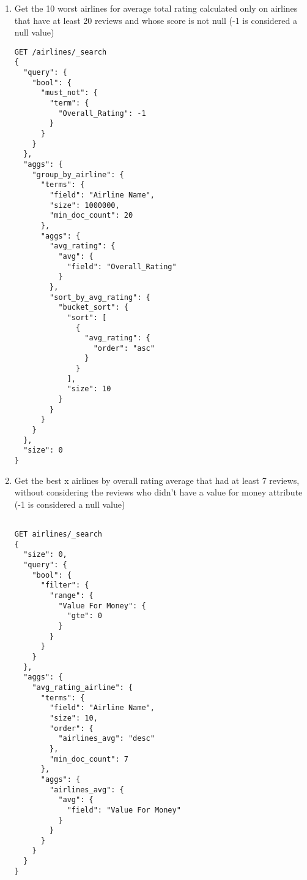 \documentclass{Configuration_Files/PoliMi3i_thesis}
\begin{document}
\begin{enumerate}
    \item Get the 10 worst airlines for average total rating calculated only on airlines that have at least 20 reviews and whose score is not null (-1 is considered a null value)

    \begin{verbatim}
GET /airlines/_search
{
  "query": {
    "bool": {
      "must_not": {
        "term": {
          "Overall_Rating": -1
        }
      }
    }
  },
  "aggs": {
    "group_by_airline": {
      "terms": {
        "field": "Airline Name",
        "size": 1000000, 
        "min_doc_count": 20
      },
      "aggs": {
        "avg_rating": {
          "avg": {
            "field": "Overall_Rating"
          }
        },
        "sort_by_avg_rating": {
          "bucket_sort": {
            "sort": [
              {
                "avg_rating": {
                  "order": "asc"  
                }
              }
            ],
            "size": 10 
          }
        }
      }
    }
  },
  "size": 0
}

    \end{verbatim}
    
    \item Get the best x airlines by overall rating average that had at least 7 reviews, without considering the reviews who didn't have a value for money attribute (-1 is considered a null value)

    \begin{verbatim}
        
GET airlines/_search
{
  "size": 0,
  "query": {
    "bool": {
      "filter": {
        "range": {
          "Value For Money": {
            "gte": 0
          }
        }
      }
    }
  },
  "aggs": {
    "avg_rating_airline": {
      "terms": {
        "field": "Airline Name",
        "size": 10,
        "order": {
          "airlines_avg": "desc"
        },
        "min_doc_count": 7
      },
      "aggs": {
        "airlines_avg": {
          "avg": {
            "field": "Value For Money"
          }
        }
      }
    }
  }
}
    \end{verbatim}
\end{enumerate}
\end{document}
